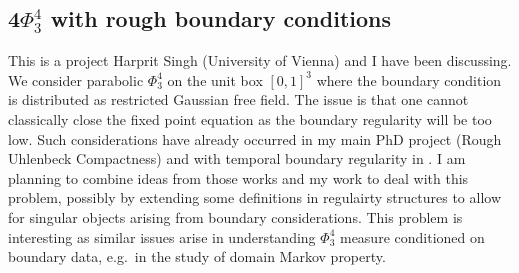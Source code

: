\documentclass[12pt]{article}
\numberwithin{equation}{section}
\theoremstyle{definition}
\theoremstyle{remark}
\newcommand{\1}{\mathbf 1}
\newcommand{\<}{\langle}
\renewcommand{\>}{\rangle}
\begin{document}






\subsection*{4\quad $\Phi^4_3$ with rough boundary conditions}
This is a project Harprit Singh (University of Vienna) and I have been discussing. We consider parabolic $\Phi^4_3$ on the unit box $[0,1]^3$ where the boundary condition is distributed as restricted Gaussian free field. The issue is that one cannot classically close the fixed point equation as the boundary regularity will be too low. Such considerations have already occurred in my main PhD project (Rough Uhlenbeck Compactness) and with temporal boundary regularity in  \cite{CCHS3d,CM24}. I am planning to combine ideas from those works and my work to deal with this problem, possibly by extending some definitions in regulairty structures to allow for singular objects arising from boundary considerations. This problem is interesting as similar issues arise in understanding $\Phi^4_3$ measure conditioned on boundary data, e.g.\ in the study of domain Markov property.
\end{document}
